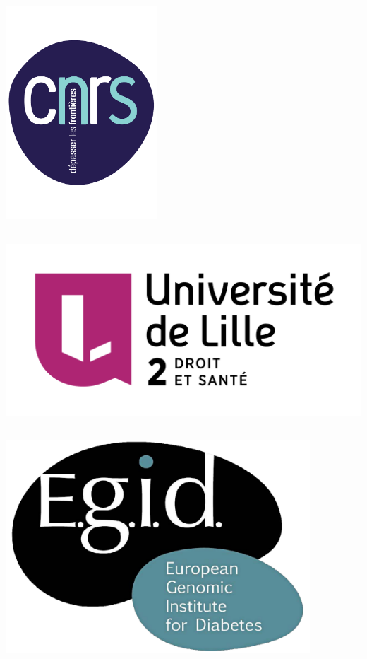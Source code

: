 \documentclass[a0,portrait]{a0poster}
\begin{document}
\begin{center}
\vfill
{\hspace{2.5cm}\includegraphics[height=8cm, keepaspectratio]{../UTILS/Logos/logo_cnrs.pdf} \hspace{10cm} \includegraphics[height=8cm, keepaspectratio]{../UTILS/Logos/UL2-WEB-2014.png} \hspace{10cm} \includegraphics[height=8cm, keepaspectratio]{../UTILS/Logos/logo_egid.pdf}}
\end{center}
\end{document}
